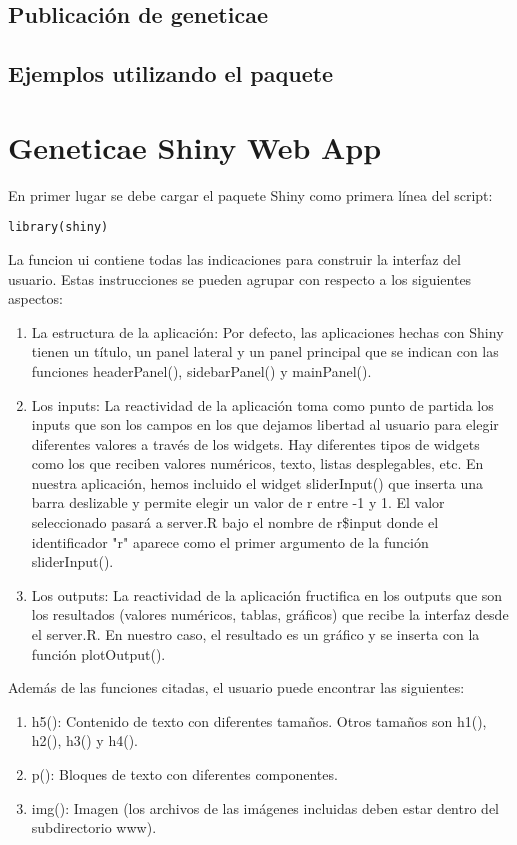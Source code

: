 \subsection{Publicación de geneticae}

\subsection{Ejemplos utilizando el paquete}

\section{Geneticae Shiny Web App}

En primer lugar se debe cargar el paquete Shiny como primera línea del script:

\begin{lstlisting}[frame=single]
library(shiny) 
\end{lstlisting}

La funcion ui contiene todas las indicaciones para construir la interfaz del usuario. Estas instrucciones se pueden agrupar con respecto a los siguientes aspectos:
\begin{enumerate}
\item La estructura de la aplicación: Por defecto, las aplicaciones hechas con Shiny tienen un título, un panel lateral y un panel principal que se indican con las funciones headerPanel(), sidebarPanel() y mainPanel().
\item Los inputs: La reactividad de la aplicación toma como punto de partida los inputs que son los campos en los que dejamos libertad al usuario para elegir diferentes valores a través de los widgets. Hay diferentes tipos de widgets como los que reciben valores numéricos, texto, listas desplegables, etc. En nuestra aplicación, hemos incluido el widget sliderInput() que inserta una barra deslizable y permite elegir un valor de r entre -1 y 1. El valor seleccionado pasará a server.R bajo el nombre de r\$input donde el identificador "r" aparece como el primer argumento de la función sliderInput().
\item Los outputs: La reactividad de la aplicación fructifica en los outputs que son los resultados (valores numéricos, tablas, gráficos) que recibe la interfaz desde el server.R. En nuestro caso, el resultado es un gráfico y se inserta con la función
plotOutput().
\end{enumerate}

Además de las funciones citadas, el usuario puede encontrar las siguientes:
\begin{enumerate}
\item  h5(): Contenido de texto con diferentes tamaños. Otros tamaños son h1(), h2(), h3() y h4().
\item p(): Bloques de texto con diferentes componentes.
\item img(): Imagen (los archivos de las imágenes incluidas deben estar dentro del subdirectorio www).
\end{enumerate}

